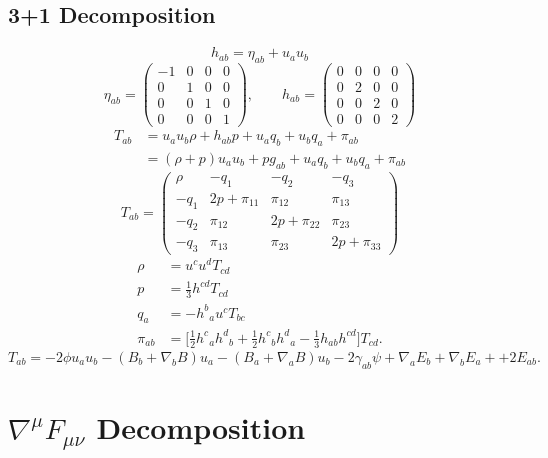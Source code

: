 \documentclass[10pt,letterpaper]{article}
\numberwithin{equation}{subsection}
\begin{document}
\subsection{3+1 Decomposition}
\begin{equation}
h_{ab} = \eta_{ab} + u_au_b
\end{equation}
\begin{equation}
\eta_{ab} =
	\begin{pmatrix}
	 -1&0&0&0\\ 0&1&0&0\\ 0&0&1&0 \\ 0&0&0&1
	\end{pmatrix},\qquad
h_{ab} =
	\begin{pmatrix}
	 0&0&0&0\\ 0&2&0&0\\ 0&0&2&0 \\ 0&0&0&2
	\end{pmatrix}
\end{equation}
\begin{align}
	T_{ab} &= u_a u_b \rho + h_{ab}p + u_a q_b + u_b q_a + \pi_{ab}
\nonumber\\
	&= (\rho + p)u_au_b + pg_{ab} + u_a q_b + u_b q_a + \pi_{ab}
\end{align} 
\begin{equation}
T_{ab} =
	\begin{pmatrix}
	 \rho&-q_1&-q_2&-q_3 \\
	-q_1& 2p+\pi_{11}&\pi_{12}&\pi_{13}\\
	-q_2 & \pi_{12} & 2p + \pi_{22}& \pi_{23}\\
	-q_3 & \pi_{13} &\pi_{23} & 2p + \pi_{33}
	\end{pmatrix}
\end{equation}
\begin{align}
	\rho &= u^cu^dT_{cd}\\
	p &= \frac13 h^{cd}T_{cd}\\
	q_a &  = -h^b{}_a{} u^c  T_{bc} \\
	\pi_{ab} &=  \bigg[ \frac12 h^c{}_a h^d{}_b+\frac12 h^c{}_b h^d{}_a - \frac13 h_{ab}h^{cd}\bigg] T_{cd}.
\end{align}
\begin{equation}
	T_{ab} = -2\phi u_a u_b - (B_b + \nabla_b B)u_a - (B_a+\nabla_a B)u_b - 2\gamma_{ab} \psi + \nabla_a E_b + \nabla _b E_a +
	+2E_{ab}.
\end{equation}
\section{$\nabla^\mu F_{\mu\nu}$ Decomposition}
\end{document}
